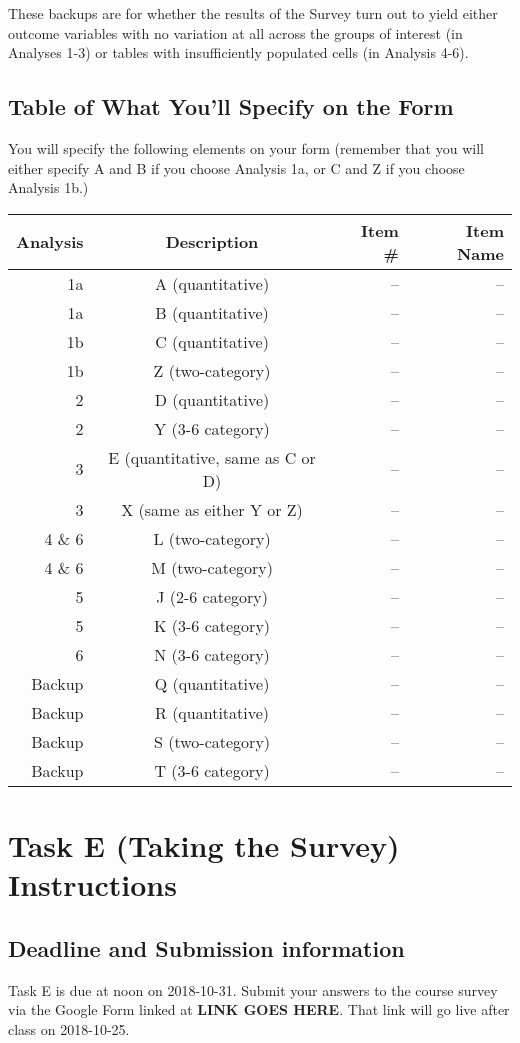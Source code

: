\documentclass[]{book}
\theoremstyle{definition}
\theoremstyle{definition}
\theoremstyle{definition}
\theoremstyle{remark}
\begin{document}
These backups are for whether the results of the Survey turn out to
yield either outcome variables with no variation at all across the
groups of interest (in Analyses 1-3) or tables with insufficiently
populated cells (in Analysis 4-6).

\hypertarget{table-of-what-youll-specify-on-the-form}{%
\section{Table of What You'll Specify on the
Form}\label{table-of-what-youll-specify-on-the-form}}

You will specify the following elements on your form (remember that you
will either specify A and B if you choose Analysis 1a, or C and Z if you
choose Analysis 1b.)

\begin{longtable}[]{@{}rcrr@{}}
\toprule
Analysis & Description & Item \# & Item Name\tabularnewline
\midrule
\endhead
1a & A (quantitative) & -- & --\tabularnewline
1a & B (quantitative) & -- & --\tabularnewline
1b & C (quantitative) & -- & --\tabularnewline
1b & Z (two-category) & -- & --\tabularnewline
2 & D (quantitative) & -- & --\tabularnewline
2 & Y (3-6 category) & -- & --\tabularnewline
3 & E (quantitative, same as C or D) & -- & --\tabularnewline
3 & X (same as either Y or Z) & -- & --\tabularnewline
4 \& 6 & L (two-category) & -- & --\tabularnewline
4 \& 6 & M (two-category) & -- & --\tabularnewline
5 & J (2-6 category) & -- & --\tabularnewline
5 & K (3-6 category) & -- & --\tabularnewline
6 & N (3-6 category) & -- & --\tabularnewline
Backup & Q (quantitative) & -- & --\tabularnewline
Backup & R (quantitative) & -- & --\tabularnewline
Backup & S (two-category) & -- & --\tabularnewline
Backup & T (3-6 category) & -- & --\tabularnewline
\bottomrule
\end{longtable}

\hypertarget{taskE}{%
\chapter{Task E (Taking the Survey) Instructions}\label{taskE}}

\hypertarget{deadline-and-submission-information-4}{%
\section{Deadline and Submission
information}\label{deadline-and-submission-information-4}}

Task E is due at noon on 2018-10-31. Submit your answers to the course
survey via the Google Form linked at \textbf{LINK GOES HERE}. That link
will go live after class on 2018-10-25.
\end{document}

